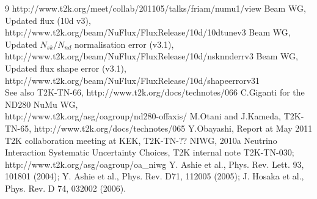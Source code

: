 \documentclass[final]{elsarticle}
\begin{document}
\begin{thebibliography}{9}
   http://www.t2k.org/meet/collab/201105/talks/friam/numu1/view	
   Beam WG, Updated flux (10d v3), http://www.t2k.org/beam/NuFlux/FluxRelease/10d/10dtunev3
   Beam WG, Updated $N_{sk}/N_{nd}$ normalisation error (v3.1),\\
   http://www.t2k.org/beam/NuFlux/FluxRelease/10d/nsknnderrv3
   Beam WG, Updated flux shape error (v3.1), http://www.t2k.org/beam/NuFlux/FluxRelease/10d/shapeerrorv31 \\
   See also T2K-TN-66, http://www.t2k.org/docs/technotes/066
  C.Giganti for the ND280 NuMu WG,\\
  http://www.t2k.org/asg/oagroup/nd280-offaxis/
   M.Otani and J.Kameda,
   T2K-TN-65,
   http://www.t2k.org/docs/technotes/065
   Y.Obayashi, Report at May 2011 T2K collaboration meeting at KEK,
   T2K-TN-??
  NIWG, 2010a Neutrino Interaction Systematic Uncertainty Choices, T2K internal note T2K-TN-030;
  http://www.t2k.org/asg/oagroup/oa\_niwg
  Y. Ashie et al., Phys. Rev. Lett. 93, 101801 (2004);
  Y. Ashie et al., Phys. Rev. D71, 112005 (2005); 
  J. Hosaka et al., Phys. Rev. D 74, 032002 (2006).

\end{thebibliography}
\end{document}
